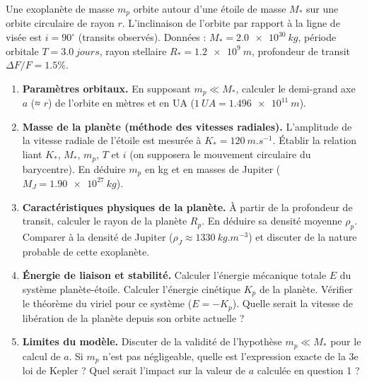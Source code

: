 \documentclass[11pt]{article}
\begin{document}
\begin{exercice}
Une exoplanète de masse $m_p$ orbite autour d'une étoile de masse $M_*$ sur une orbite circulaire de rayon $r$. L'inclinaison de l'orbite par rapport à la ligne de visée est $i = 90^\circ$ (transits observés). Données : $M_* = \SI{2.0e30}{kg}$, période orbitale $T = \SI{3.0}{jours}$, rayon stellaire $R_* = \SI{1.2e9}{m}$, profondeur de transit $\Delta F / F = 1.5\%$.
\begin{enumerate}
    \item \textbf{Paramètres orbitaux.} En supposant $m_p \ll M_*$, calculer le demi-grand axe $a$ (≈ $r$) de l'orbite en mètres et en UA ($\SI{1}{UA} = \SI{1.496e11}{m}$).
    \item \textbf{Masse de la planète (méthode des vitesses radiales).} L'amplitude de la vitesse radiale de l'étoile est mesurée à $K_* = \SI{120}{m.s^{-1}}$. Établir la relation liant $K_*$, $M_*$, $m_p$, $T$ et $i$ (on supposera le mouvement circulaire du barycentre). En déduire $m_p$ en kg et en masses de Jupiter ($M_J = \SI{1.90e27}{kg}$).
    \item \textbf{Caractéristiques physiques de la planète.} À partir de la profondeur de transit, calculer le rayon de la planète $R_p$. En déduire sa densité moyenne $\rho_p$. Comparer à la densité de Jupiter ($\rho_J \approx \SI{1330}{kg.m^{-3}}$) et discuter de la nature probable de cette exoplanète.
    \item \textbf{Énergie de liaison et stabilité.} Calculer l'énergie mécanique totale $E$ du système planète-étoile. Calculer l'énergie cinétique $K_p$ de la planète. Vérifier le théorème du viriel pour ce système ($E = -K_p$). Quelle serait la vitesse de libération de la planète depuis son orbite actuelle ?
    \item \textbf{Limites du modèle.} Discuter de la validité de l'hypothèse $m_p \ll M_*$ pour le calcul de $a$. Si $m_p$ n'est pas négligeable, quelle est l'expression exacte de la 3e loi de Kepler ? Quel serait l'impact sur la valeur de $a$ calculée en question 1 ?
\end{enumerate}
\end{exercice}
\end{document}
